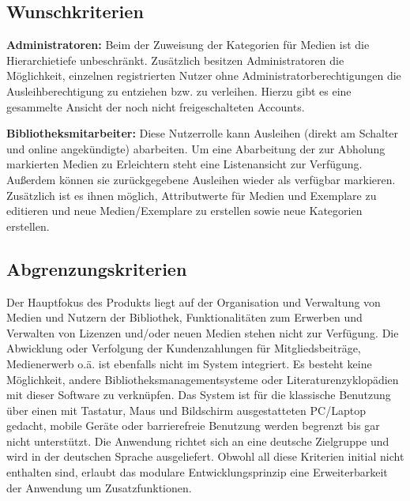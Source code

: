 \documentclass{article}
\begin{document}
\subsection{Wunschkriterien}

\begin{flushleft}
\textbf{Administratoren:} Beim der Zuweisung der Kategorien für Medien ist die Hierarchietiefe unbeschränkt. Zusätzlich besitzen Administratoren die Möglichkeit, einzelnen registrierten Nutzer ohne Administratorberechtigungen die Ausleihberechtigung zu entziehen bzw. zu verleihen. Hierzu gibt es eine gesammelte Ansicht der noch nicht freigeschalteten Accounts.
\end{flushleft}

\begin{flushleft}
\textbf{Bibliotheksmitarbeiter:} Diese Nutzerrolle kann Ausleihen (direkt am Schalter und online angekündigte) abarbeiten. Um eine Abarbeitung der zur Abholung markierten Medien zu Erleichtern steht eine Listenansicht zur Verfügung. Außerdem können sie zurückgegebene Ausleihen wieder als verfügbar markieren. Zusätzlich ist es ihnen möglich, Attributwerte für Medien und Exemplare zu editieren und neue Medien/Exemplare zu erstellen sowie neue Kategorien erstellen.
\end{flushleft}

\subsection{Abgrenzungskriterien}

Der Hauptfokus des Produkts liegt auf der Organisation und Verwaltung von Medien und Nutzern der Bibliothek, Funktionalitäten zum Erwerben und Verwalten von Lizenzen und/oder neuen Medien stehen nicht zur Verfügung. Die Abwicklung oder Verfolgung der Kundenzahlungen für Mitgliedsbeiträge, Medienerwerb o.ä. ist ebenfalls nicht im System integriert. Es besteht keine Möglichkeit, andere Bibliotheksmanagementsysteme oder Literaturenzyklopädien mit dieser Software zu verknüpfen. Das System ist für die klassische Benutzung über einen mit Tastatur, Maus und Bildschirm ausgestatteten PC/Laptop gedacht, mobile Geräte oder barrierefreie Benutzung werden begrenzt bis gar nicht unterstützt. Die Anwendung richtet sich an eine deutsche Zielgruppe und wird in der deutschen Sprache ausgeliefert. Obwohl all diese Kriterien initial nicht enthalten sind, erlaubt das modulare Entwicklungsprinzip eine Erweiterbarkeit der Anwendung um Zusatzfunktionen.

\newpage
\end{document}
